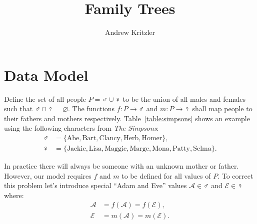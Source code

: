 \documentclass[letterpaper,11pt]{article}
\title{Family Trees}
\author{Andrew Kritzler}
\begin{document}
\maketitle

\section{Data Model}

Define the set of all people \(P = \male \cup \female\) to be the union of all males and females such that \(\male \cap \female = \varnothing\).
The functions \(f : P \to \male\) and \(m : P \to \female\) shall map people to their fathers and mothers respectively.
Table~\ref{table:simpsons} shows an example using the following characters from \textit{The Simpsons}:
\begin{align*}
    \male   & = \{\text{Abe}, \text{Bart}, \text{Clancy}, \text{Herb}, \text{Homer}\},                                \\
    \female & = \{\text{Jackie}, \text{Lisa}, \text{Maggie}, \text{Marge}, \text{Mona}, \text{Patty}, \text{Selma}\}.
\end{align*}

In practice there will always be someone with an unknown mother or father.
However, our model requires \(f\) and \(m\) to be defined for all values of \(P\).
To correct this problem let's introduce special ``Adam and Eve'' values \(\mathcal{A} \in \male\) and \(\mathcal{E} \in \female\) where:
\begin{align*}
    \mathcal{A} & = f(\mathcal{A}) = f(\mathcal{E}), \\
    \mathcal{E} & = m(\mathcal{A}) = m(\mathcal{E}).
\end{align*}
\end{document}
